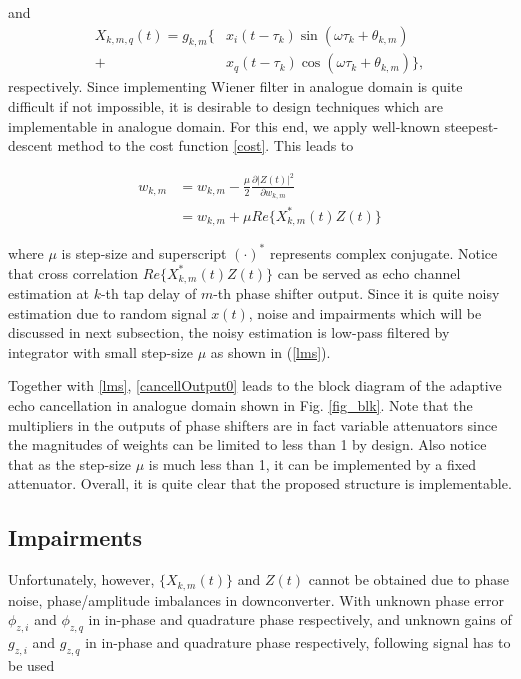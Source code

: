 \documentclass[twocolumn]{IEEEtran}
\begin{document}
and
\begin{align}\label{X-kmq}
X_{k,m,q}(t)= g_{k,m} \{ & x_i(t-\tau_k) \sin ( \omega \tau_k
+\theta_{k,m}) \nonumber \\
+& x_q(t-\tau_k) \cos (\omega \tau_k +\theta_{k,m})\},
\end{align}
respectively. Since implementing Wiener filter in analogue domain is
quite difficult if not impossible, it is desirable to design
techniques which are implementable in analogue domain. For this end,
we apply well-known steepest-descent method to the cost function
\eqref{cost}. This leads to

\begin{align}
w_{k,m}&= w_{k,m}-\frac{\mu}{2} \frac{\partial | Z(t) |^2} {\partial
w_{k,m}} \nonumber \\
&=w_{k,m}+ \mu Re\{ X_{k,m}^*(t) Z(t) \}\label{lms}
\end{align}

\noindent where $\mu$ is step-size and superscript $(\cdot)^*$
represents complex conjugate. Notice that cross correlation $Re\{
X_{k,m}^*(t) Z(t) \}$ can be served as echo channel estimation at
$k$-th tap delay of $m$-th phase shifter output. Since it is quite
noisy estimation due to random signal $x(t)$, noise and impairments
which will be discussed in next subsection, the noisy estimation is
low-pass filtered by integrator with small step-size $\mu$ as shown
in (\ref{lms}).

Together with \eqref{lms}, \eqref{cancellOutput0} leads to the block
diagram of the adaptive echo cancellation in analogue domain shown
in Fig. \ref{fig_blk}. Note that the multipliers in the outputs of
phase shifters are in fact variable attenuators since the magnitudes
of weights can be limited to less than 1 by design. Also notice that
as the step-size $\mu$ is much less than 1, it can be implemented by
a fixed attenuator. Overall, it is quite clear that the proposed
structure is implementable.

\subsection{Impairments}

Unfortunately, however, $\{X_{k,m}(t)\}$ and $Z(t)$ cannot be
obtained due to phase noise, phase/amplitude imbalances in
downconverter. With unknown phase error $\phi_{z,i}$ and
$\phi_{z,q}$ in in-phase and quadrature phase respectively, and
unknown gains of $g_{z,i}$ and $g_{z,q}$ in in-phase and quadrature
phase respectively, following signal has to be used
\end{document}
